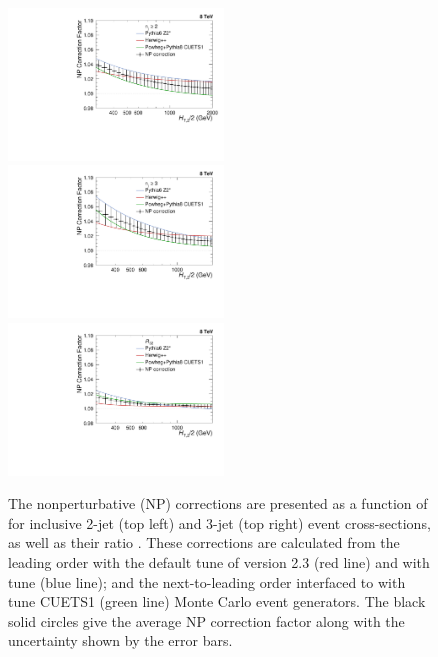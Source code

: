 \begin{figure}[!ht]
 \begin{center}
 \hspace*{-5mm}\includegraphics[width=0.51\textwidth]{Plots_HT_2_150/Final_NP_Corr_2.pdf}%
 ~~\includegraphics[width=0.51\textwidth]{Plots_HT_2_150/Final_NP_Corr_3.pdf}\\
 \includegraphics[width=0.51\textwidth]{Plots_HT_2_150/Final_NP_Corr_Ratio_32.pdf}
 \caption[The nonperturbative (NP) corrections are presented as a function of \httwo.]{The nonperturbative (NP) corrections are presented as a function of \httwo for inclusive 2-jet (top left) and 3-jet (top right) event cross-sections, as well as their ratio \ratio. These corrections are calculated from the leading order \HERWIGPP with the default tune of version 2.3 (red line) and \PYTHIAS with tune \Ztwostar (blue line); and the next-to-leading order \POWHEG interfaced to \PYTHIAE with tune CUETS1 (green line) Monte Carlo event generators. The black solid circles give the average NP correction factor along with the uncertainty shown by the error bars. }
 \label{fig:np_factors}
 \end{center}
\end{figure}


